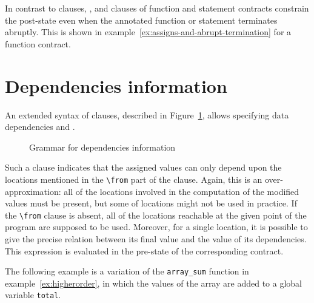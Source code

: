 In contrast to \ensures clauses, \assigns{},
\allocates{} and \frees{} clauses of function
and statement contracts constrain the post-state
even when the annotated function or statement terminates abruptly.
This is shown in example~\ref{ex:assigns-and-abrupt-termination} for a function contract.




\section{Dependencies information}
\label{sec:func-dep}

\experimental

An extended syntax of \assigns clauses, described in
Figure~\ref{fig:gram:dep}, allows specifying data
dependencies and
.

\begin{figure}[htp]
  \begin{cadre}
      
    \end{cadre}
  \caption{Grammar for dependencies information}
\label{fig:gram:dep}
\end{figure}

Such a clause indicates that the assigned values can only depend upon
the locations mentioned in the \lstinline|\from| part of the
clause. Again, this is an over-approximation: all of the locations
involved in the computation of the modified values must be present,
but some of locations might not be used in practice. If the
\lstinline|\from| clause is absent, all of the locations reachable at the
given point of the program are supposed to be used.
Moreover, for a single location, it is possible to give the precise
relation between its final value and the value of its
dependencies. This expression is evaluated in the pre-state of the
corresponding contract.

\begin{example}
  The following example is a variation of the \lstinline+array_sum+
  function in example~\ref{ex:higherorder}, in which the values of
  the array are added to a global variable \lstinline+total+.


\end{example}


